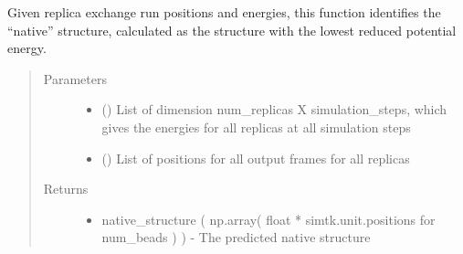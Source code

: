 \documentclass[letterpaper,12pt,english,openany,oneside]{sphinxmanual}
\begin{document}
\begin{fulllineitems}
\label{\detokenize{ensembles:ensembles.ens_build.get_native_structure}}
Given replica exchange run positions and energies, this function identifies the “native” structure, calculated as the structure with the lowest reduced potential energy.
\begin{quote}\begin{description}
\item[{Parameters}] \leavevmode\begin{itemize}
\item {} 
 (\sphinxstyleliteralemphasis{\sphinxupquote{( }}\sphinxstyleliteralemphasis{\sphinxupquote{( }}\sphinxstyleliteralemphasis{\sphinxupquote{ ) }}\sphinxstyleliteralemphasis{\sphinxupquote{ )}}) \textendash{} List of dimension num\_replicas X simulation\_steps, which gives the energies for all replicas at all simulation steps

\item {} 
 (\sphinxstyleliteralemphasis{\sphinxupquote{( }}\sphinxstyleliteralemphasis{\sphinxupquote{( }}\sphinxstyleliteralemphasis{\sphinxupquote{ ) }}\sphinxstyleliteralemphasis{\sphinxupquote{ )}}) \textendash{} List of positions for all output frames for all replicas

\end{itemize}

\item[{Returns}] \leavevmode
\begin{itemize}
\item {} 
native\_structure ( np.array( float * simtk.unit.positions for num\_beads ) ) - The predicted native structure

\end{itemize}


\end{description}\end{quote}

\end{fulllineitems}
\end{document}
